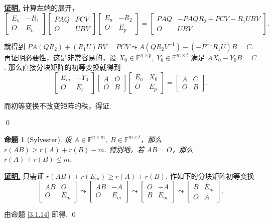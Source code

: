 \documentclass[10pt,openany]{article}
\theoremstyle{thmstyle} %
\theoremstyle{defstyle} %
\theoremstyle{prostyle} %
\newtheorem{proposition}[theorem]{命题}
\theoremstyle{exastyle}
\theoremstyle{remstyle}
\renewenvironment{proof}[1][证明]{\par\underline{\textbf{#1.}} \;\fangsong}{\qed\par}
\newcommand{\F}{\mathbb{F}}
\newcommand{\nm}{^{n \times m}}
\begin{document}
\begin{proof}
	计算左端的展开，
	\[ \begin{bmatrix}
		E_n & -R_1 \\ O & E_t
	\end{bmatrix}\begin{bmatrix}
		PAQ &  PCV \\ O & UBV
	\end{bmatrix}\begin{bmatrix}
		E_n & -R_2 \\ O & E_p
	\end{bmatrix}=\begin{bmatrix}
	PAQ &  -PAQR_2+PCV-R_1UBV \\ O & UBV
	\end{bmatrix}. \]
	
	就得到 \( PA(QR_2)+(R_1U)BV=PCV \leadsto A(QR_2V^{-1})-(-P^{-1}R_1U)B=C \). 再证明必要性，这是非常容易的，设 \( X_0 \in \F^{n \times p}, \; Y_0 \in \F^{m \times t} \) 满足 \( AX_0-Y_0B=C \). 那么直接分块矩阵的初等变换就得到
	\[ \begin{bmatrix}
		E_m & -Y_0 \\ O & E_t
	\end{bmatrix}\begin{bmatrix}
		A & O \\ O & B
	\end{bmatrix}\begin{bmatrix}
	E_n & X_0 \\ O & E_p
	\end{bmatrix}=\begin{bmatrix}
		A & C \\ O & B
	\end{bmatrix}. \]
	
	而初等变换不改变矩阵的秩，得证.
	
\end{proof}

\begin{proposition}[Sylvester] \label{3.1.16}
	设 \( A \in \F\nm, \; B \in \F^{m \times t} \)，那么 \( r(AB) \geq r(A)+r(B)-m \). 特别地，若 \( AB=O \)，那么 \( r(A)+r(B) \leq m \).
\end{proposition}

\begin{proof}
	只需证 \( r(AB)+r(E_m) \geq r(A)+r(B) \). 作如下的分块矩阵初等变换
	\[ \begin{bmatrix}
		AB & O \\ O & E_m
	\end{bmatrix} \leadsto \begin{bmatrix}
	AB & -A \\ O & E_m
	\end{bmatrix} \leadsto \begin{bmatrix}
	O & -A \\ B & E_m
	\end{bmatrix} \leadsto \begin{bmatrix}
	 B & E_m \\ O & A
	\end{bmatrix}. \]
	
	由命题 \ref{3.1.14} 即得. 
\end{proof}
\end{document}
